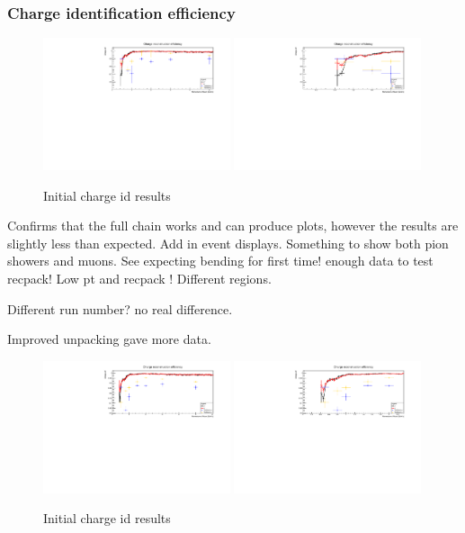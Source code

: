 \subsubsection{Charge identification efficiency}

\begin{figure}[h!]
\centering
\includegraphics[width=0.49\textwidth]{figures/oldStudies/newChargeZoom5.pdf}
\includegraphics[width=0.49\textwidth]{figures/oldStudies/newChargeZoom1.pdf}
\caption{Initial charge id results}
\label{fig:ChargeInitial}
\end{figure}
Confirms that the full chain works and can produce plots, however the results are slightly less than expected. Add in event displays. Something to show both pion showers and muons. See expecting bending for first time! enough data to test recpack! Low pt and recpack ! Different regions.

Different run number? no real difference.

Improved unpacking gave more data.

\begin{figure}[h!]
\centering
\includegraphics[width=0.49\textwidth]{figures/testbeam/TestBeam090318Plots/ChargeIDFull6GeV.pdf}
\includegraphics[width=0.49\textwidth]{figures/testbeam/TestBeam090318Plots/ChargeIDFullLow.pdf}
\caption{Initial charge id results}
\label{fig:ChargeImproved}
\end{figure}

